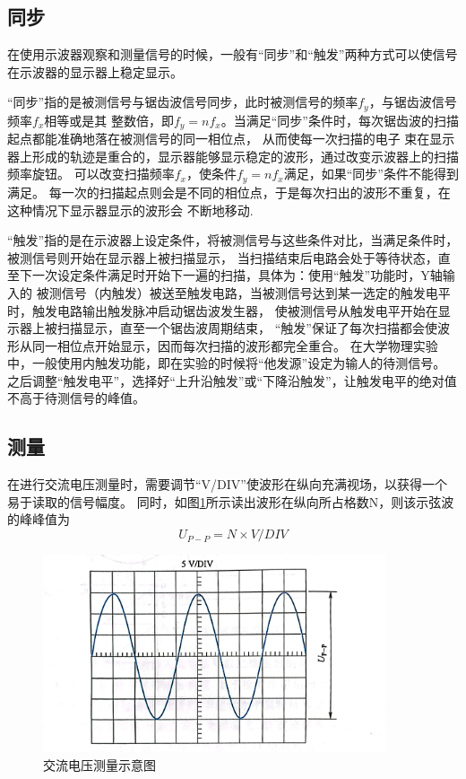\documentclass{ctexart}
\begin{document}
  \subsection{同步}
  在使用示波器观察和测量信号的时候，一般有“同步”和“触发”两种方式可以使信号在示波器的显示器上稳定显示。

  “同步”指的是被测信号与锯齿波信号同步，此时被测信号的频率$f_{y}$，与锯齿波信号频率$f_{x}$相等或是其
  整数倍，即$f_{y}=nf_{x}$。当满足“同步”条件时，每次锯齿波的扫描起点都能准确地落在被测信号的同一相位点，
  从而使每一次扫描的电子
  束在显示器上形成的轨迹是重合的，显示器能够显示稳定的波形，通过改变示波器上的扫描频率旋钮。
  可以改变扫描频率$f_{x}$，使条件$f_{y}=nf_{x}$满足，如果“同步”条件不能得到满足。
  每一次的扫描起点则会是不同的相位点，于是每次扫出的波形不重复，在这种情况下显示器显示的波形会
  不断地移动.

  “触发”指的是在示波器上设定条件，将被测信号与这些条件对比，当满足条件时，被测信号则开始在显示器上被扫描显示，
  当扫描结束后电路会处于等待状态，直至下一次设定条件满足时开始下一遍的扫描，具体为：使用“触发”功能时，Y轴输入的
  被测信号（内触发）被送至触发电路，当被测信号达到某一选定的触发电平时，触发电路输出触发脉冲启动锯齿波发生器，
  使被测信号从触发电平开始在显示器上被扫描显示，直至一个锯齿波周期结束，
  “触发”保证了每次扫描都会使波形从同一相位点开始显示，因而每次扫描的波形都完全重合。
  在大学物理实验中，一般使用内触发功能，即在实验的时候将“他发源”设定为输人的待测信号。
  之后调整“触发电平”，选择好“上升沿触发”或“下降沿触发”，让触发电平的绝对值不高于待测信号的峰值。

  \subsection{测量}
  在进行交流电压测量时，需要调节“V/DIV”使波形在纵向充满视场，以获得一个易于读取的信号幅度。
  同时，如图\ref{jiaoliuceliang}所示读出波形在纵向所占格数N，则该示弦波的峰峰值为
  \begin{equation}
    U_{P-P}=N \times V/DIV
  \end{equation}

  \begin{figure}[bt]\label{jiaoliuceliang}
    \centering
    \includegraphics[width=0.9\textwidth,height=0.3\textheight]{jiaoliuceliang.jpg}
    \caption{交流电压测量示意图}
  \end{figure}
\end{document}
